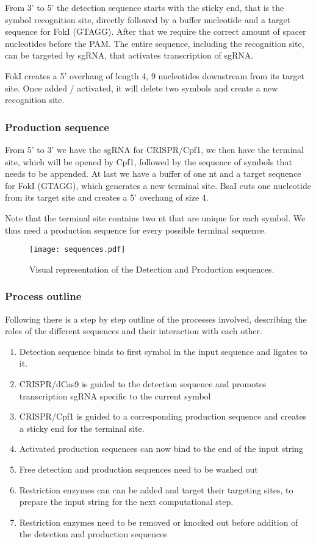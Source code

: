 \documentclass[
11pt, %
a4paper, %
oneside, %
headinclude,footinclude, %
BCOR5mm, %
]{scrartcl}
\begin{document}
From 3' to 5' the detection sequence starts with the sticky end, that is the
symbol recognition site, directly followed by a buffer nucleotide and a target
sequence for FokI (GTAGG). After that we require the correct amount of spacer
nucleotides before the PAM. The entire sequence, including the recognition site,
can be targeted by sgRNA, that activates transcription of sgRNA.

FokI creates a 5' overhang of length 4, 9 nucleotides downstream from its
target site. Once added / activated, it will delete two symbols and create a new
recognition site.

\subsubsection{Production sequence}

From 5' to 3' we have the sgRNA for CRISPR/Cpf1, we then have the terminal site,
which will be opened by Cpf1, followed by the sequence of symbols that needs to
be appended. At last we have a buffer of one nt and a target sequence for FokI (GTAGG), which
generates a new terminal site. BsaI cuts one nucleotide from its target site and
creates a 5' overhang of size 4.

Note that the terminal site contains two nt that are unique for each symbol. We
thus need a production sequence for every possible terminal sequence.

\begin{figure}[h]
  \texttt{[image: sequences.pdf]}
  \centering
  \caption{Visual representation of the Detection and Production sequences.}
\end{figure}


\subsubsection{Process outline}

Following there is a step by step outline of the processes involved, describing
the roles of the different sequences and their interaction with each other.
\begin{enumerate}
  \item Detection sequence binds to first symbol in the input sequence and
    ligates to it.
  \item CRISPR/dCas9 is guided to the detection sequence and promotes
    transcription sgRNA specific to the current symbol
  \item CRISPR/Cpf1 is guided to a corresponding production sequence and creates
    a sticky end for the terminal site.
  \item Activated production sequences can now bind to the end of the input
    string
  \item Free detection and production sequences need to be washed out
  \item Restriction enzymes can can be added and target their targeting sites,
    to prepare the input string for the next computational step.
  \item Restriction enzymes need to be removed or knocked out before addition of
    the detection and production sequences
\end{enumerate}
\end{document}
